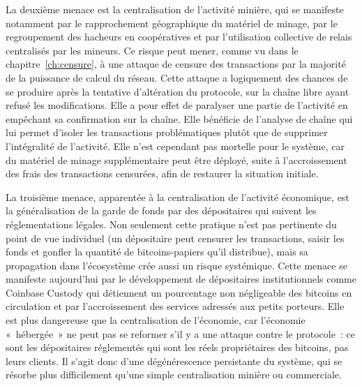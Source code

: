 La deuxième menace est la centralisation de l'activité minière, qui se manifeste notamment par le rapprochement géographique du matériel de minage, par le regroupement des hacheurs en coopératives et par l'utilisation collective de relais centralisés par les mineurs. Ce risque peut mener, comme vu dans le chapitre~\ref{ch:censure}, à une attaque de censure des transactions par la majorité de la puissance de calcul du réseau. Cette attaque a logiquement des chances de se produire après la tentative d'altération du protocole, sur la chaîne libre ayant refusé les modifications. Elle a pour effet de paralyser une partie de l'activité en empêchant sa confirmation sur la chaîne. Elle bénéficie de l'analyse de chaîne qui lui permet d'isoler les transactions problématiques plutôt que de supprimer l'intégralité de l'activité. Elle n'est cependant pas mortelle pour le système, car du matériel de minage supplémentaire peut être déployé, suite à l'accroissement des frais des transactions censurées, afin de restaurer la situation initiale. %


La troisième menace, apparentée à la centralisation de l'activité économique, est la généralisation de la garde de fonds par des dépositaires qui suivent les réglementations légales. Non seulement cette pratique n'est pas pertinente du point de vue individuel (un dépositaire peut censurer les transactions, saisir les fonds et gonfler la quantité de bitcoins-papiers qu'il distribue), mais sa propagation dans l'écosystème crée aussi un risque systémique. Cette menace se manifeste aujourd'hui par le développement de dépositaires institutionnels comme Coinbase Custody qui détiennent un pourcentage non négligeable des bitcoins en circulation et par l'accroissement des services adressés aux petits porteurs. Elle est plus dangereuse que la centralisation de l'économie, car l'économie «~hébergée~» ne peut pas se reformer s'il y a une attaque contre le protocole~: ce sont les dépositaires réglementés qui sont les réels propriétaires des bitcoins, pas leurs clients. Il s'agit donc d'une dégénérescence persistante du système, qui se résorbe plus difficilement qu'une simple centralisation minière ou commerciale.

